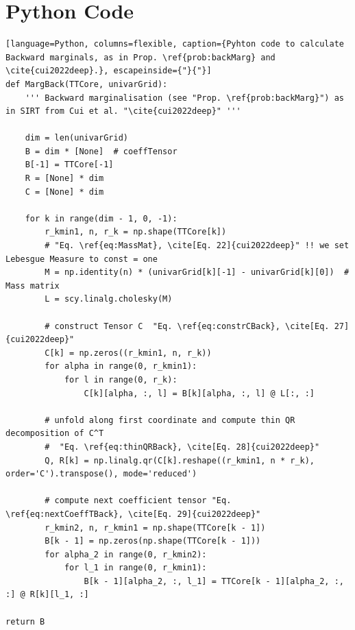 \clearpage
\section{Python Code}
\the\baselineskip

\begin{lstlisting}[language=Python, columns=flexible, caption={Pyhton code to calculate Backward marginals, as in Prop. \ref{prob:backMarg} and \cite{cui2022deep}.}, escapeinside={"}{"}]
def MargBack(TTCore, univarGrid):
	''' Backward marginalisation (see "Prop. \ref{prob:backMarg}") as in SIRT from Cui et al. "\cite{cui2022deep}" '''
	
	dim = len(univarGrid)
	B = dim * [None]  # coeffTensor
	B[-1] = TTCore[-1]
	R = [None] * dim
	C = [None] * dim
	
	for k in range(dim - 1, 0, -1):
		r_kmin1, n, r_k = np.shape(TTCore[k])
		# "Eq. \ref{eq:MassMat}, \cite[Eq. 22]{cui2022deep}" !! we set Lebesgue Measure to const = one
		M = np.identity(n) * (univarGrid[k][-1] - univarGrid[k][0])  # Mass matrix
		L = scy.linalg.cholesky(M)
		
		# construct Tensor C  "Eq. \ref{eq:constrCBack}, \cite[Eq. 27]{cui2022deep}"
		C[k] = np.zeros((r_kmin1, n, r_k))
		for alpha in range(0, r_kmin1):
			for l in range(0, r_k):
				C[k][alpha, :, l] = B[k][alpha, :, l] @ L[:, :]
		
		# unfold along first coordinate and compute thin QR decomposition of C^T
		#  "Eq. \ref{eq:thinQRBack}, \cite[Eq. 28]{cui2022deep}"
		Q, R[k] = np.linalg.qr(C[k].reshape((r_kmin1, n * r_k), order='C').transpose(), mode='reduced')
		
		# compute next coefficient tensor "Eq. \ref{eq:nextCoeffTBack}, \cite[Eq. 29]{cui2022deep}"
		r_kmin2, n, r_kmin1 = np.shape(TTCore[k - 1])
		B[k - 1] = np.zeros(np.shape(TTCore[k - 1]))
		for alpha_2 in range(0, r_kmin2):
			for l_1 in range(0, r_kmin1):
				B[k - 1][alpha_2, :, l_1] = TTCore[k - 1][alpha_2, :, :] @ R[k][l_1, :]

return B

\end{lstlisting}
\clearpage
